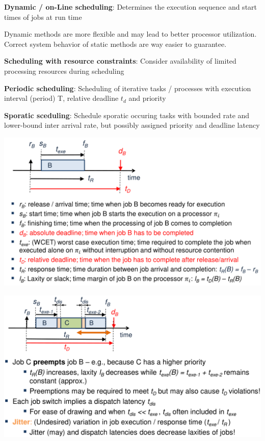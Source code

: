 \documentclass[english]{latex4ei/latex4ei_sheet}
\begin{document}
\textbf{Dynamic / on-Line scheduling}: Determines the execution sequence and
start times of jobs at run time

Dynamic methods are more flexible and may lead to better processor utilization. Correct system behavior of static methods are way easier to guarantee.

\textbf{Scheduling with resource constraints}: Consider availability of limited processing resources during scheduling

\textbf{Periodic scheduling}: Scheduling of iterative tasks / processes with execution interval (period) T, relative deadline $t_d$ and priority

\textbf{Sporatic sceduling}: Schedule sporatic occuring tasks with bounded rate and lower-bound inter arrival rate, but possibly assigned priority and deadline
latency


\begin{center}
  \centering
  \includegraphics[width=\linewidth]{assets/RealTimeParameters.png}
  \label{fig:realtimeparameters}
\end{center}

\begin{center}
  \centering
  \includegraphics[width=\linewidth]{assets/RealTimeParameters2.png}
  \label{fig:realtimeparameters2}
\end{center}
\end{document}
